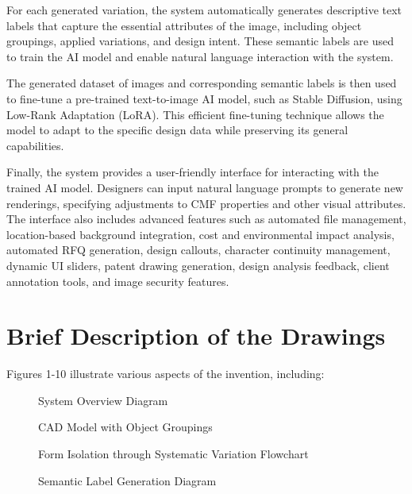 \documentclass{article}
\begin{document}
For each generated variation, the system automatically generates descriptive text labels that capture the essential attributes of the image, including object groupings, applied variations, and design intent. These semantic labels are used to train the AI model and enable natural language interaction with the system.

The generated dataset of images and corresponding semantic labels is then used to fine-tune a pre-trained text-to-image AI model, such as Stable Diffusion, using Low-Rank Adaptation (LoRA). This efficient fine-tuning technique allows the model to adapt to the specific design data while preserving its general capabilities.

Finally, the system provides a user-friendly interface for interacting with the trained AI model. Designers can input natural language prompts to generate new renderings, specifying adjustments to CMF properties and other visual attributes. The interface also includes advanced features such as automated file management, location-based background integration, cost and environmental impact analysis, automated RFQ generation, design callouts, character continuity management, dynamic UI sliders, patent drawing generation, design analysis feedback, client annotation tools, and image security features.

\section{Brief Description of the Drawings}

Figures 1-10 illustrate various aspects of the invention, including:

\begin{figure}[H]
    \centering
    \caption{System Overview Diagram}
    \label{fig:system_overview}
\end{figure}

\begin{figure}[H]
    \centering
    \caption{CAD Model with Object Groupings}
    \label{fig:cad_model_groupings}
\end{figure}

\begin{figure}[H]
    \centering
    \caption{Form Isolation through Systematic Variation Flowchart}
    \label{fig:form_isolation_flowchart}
\end{figure}

\begin{figure}[H]
    \centering
    \caption{Semantic Label Generation Diagram}
    \label{fig:semantic_label_generation}
\end{figure}
\end{document}
